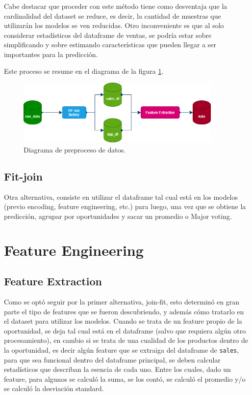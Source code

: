 \documentclass[titlepage,a4paper]{article}
\begin{document}
Cabe destacar que proceder con este método tiene como desventaja que la cardinalidad del dataset se reduce, es decir, la cantidad de muestras que utilizarán los modelos se ven reducidas. Otro inconveniente es que al solo considerar estadísticos del dataframe de ventas, se podría estar sobre simplificando y sobre estimando características que pueden llegar a ser importantes para la predicción.

Este proceso se resume en el diagrama de la figura \ref{fig:preproc_pipeline}.

\begin{figure}[H]
\centering
\includegraphics[width=0.9\textwidth]{images/preprocessing_pipeline.png}
\cprotect\caption{\label{fig:preproc_pipeline} Diagrama de preproceso de datos.}
\end{figure}

\subsection{Fit-join}\label{sub:fitjoin}
Otra alternativa, consiste en utilizar el dataframe tal cual está en los modelos (previo encoding, feature engineering, etc.) para luego, una vez que se obtiene la predicción, agrupar por oportunidades y sacar un promedio o Major voting.


\section{Feature Engineering}\label{sec:feature_engineering}

\subsection{Feature Extraction}
Como se optó seguir por la primer alternativa, join-fit, esto determinó en gran parte el tipo de features que se fueron descubriendo, y además cómo tratarlo en el dataset para utilizar los modelos. Cuando se trata de un feature propio de la oportunidad, se deja tal cual está en el dataframe (salvo que requiera algún otro procesamiento), en cambio si se trata de una cualidad de los productos dentro de la oportunidad, es decir algún feature que se extraiga del dataframe de \verb|sales|, para que sea funcional dentro del dataframe principal, se deben calcular estadísticos que describan la esencia de cada uno. Entre los cuales, dado un feature, para algunos se calculó la suma, se los contó, se calculó el promedio y/o se calculó la desviación standard.
\end{document}
